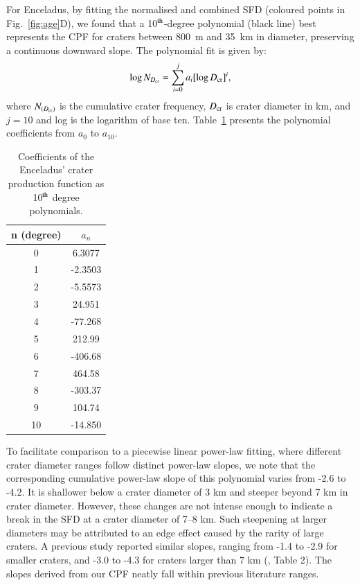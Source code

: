 \documentclass[preprint,12pt,3p,times,authoryear]{elsarticle}
\begin{document}
For Enceladus, by fitting the normalised and combined SFD (coloured points in Fig.~\ref{fig:age}D), we found that a 10$^{\rm th}$-degree polynomial (black line) best represents the CPF for craters between 800~m and 35~km in diameter, preserving a continuous downward slope. The polynomial fit is given by:
\begin{equation}
    \log N_{D_{\rm cr}} = \sum_{i=0}^{j} a_{i} [\log D_{\rm cr}]^i,
    \label{equ:cpf}
\end{equation}
where $N_{(D_{\rm cr})}$ is the cumulative crater frequency, $D_{\rm cr}$ is crater diameter in km, and $j = 10$ and log is the logarithm of base ten. Table~\ref{tab:cpf} presents the polynomial coefficients from $a_{0}$ to $a_{10}$.\\
\begin{table}[t]%
\centering
\begin{tabular}{cc}
\hline
\textbf{n (degree)} & \textbf{$a_n$} \\
\hline
0 & 6.3077  \\
1 & -2.3503 \\
2 & -5.5573 \\
3 & 24.951  \\
4 & -77.268 \\
5 & 212.99  \\
6 & -406.68 \\
7 & 464.58  \\
8 & -303.37 \\
9 & 104.74  \\
10 & -14.850 \\
\hline
\end{tabular}
\caption{Coefficients of the Enceladus’ crater production function as 10$^{\rm th}$ degree polynomials.}
\label{tab:cpf}
\end{table}

To facilitate comparison to a piecewise linear power-law fitting, where different crater diameter ranges follow distinct power-law slopes, we note that the corresponding cumulative power-law slope of this polynomial varies from -2.6 to -4.2. 
It is shallower below a crater diameter of 3 km and steeper beyond 7 km in crater diameter. However, these changes are not intense enough to indicate a break in the SFD at a crater diameter of 7--8 km. 
Such steepening at larger diameters may be attributed to an edge effect caused by the rarity of large craters. A previous study reported similar slopes, ranging from -1.4 to -2.9 for smaller craters, and -3.0 to -4.3 for craters larger than 7 km (\citealt{Kirchoff2009}, Table 2). The slopes derived from our CPF neatly fall within previous literature ranges.\\
\end{document}
